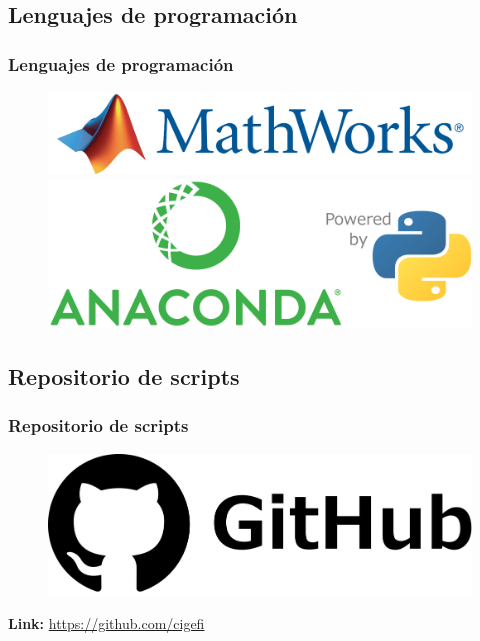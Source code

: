 \documentclass{beamer}
\newtheorem{Th1}{Reseña Historica}
\begin{document}
	\subsection{Lenguajes de programación}
	\begin{frame}
		\frametitle{Lenguajes de programación}
		\begin{figure}[!hbt]
		   \centering
		   \includegraphics[width=3.65 in]{mathworks.png}\\
		   \includegraphics[scale=0.4]{anaconda-python.png}
		\end{figure}
	\end{frame} 

	\subsection{Repositorio de scripts}
	\begin{frame}
		\frametitle{Repositorio de scripts}
		\begin{figure}[!hbt]
		   \centering
		   \includegraphics[width=4 in]{github.png}
		\end{figure}
		\textbf{Link: }\href{https://github.com/cigefi}{https://github.com/cigefi}
	\end{frame}
\end{document}
